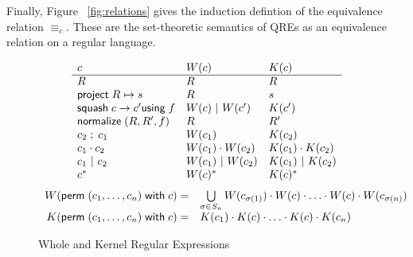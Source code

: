 \documentclass[acmsmall,review,anonymous]{acmart}
\newcommand{\kw}[1]{\ensuremath{\mathsf{#1}}}
\newcommand{\project}[2]{\ensuremath{\kw{project} \; #1 \mapsto #2}}
\newcommand{\squash}[3]{\ensuremath{\kw{squash} \; #1 \rightarrow #2
\kw{using} \; #3}}
\newcommand{\perm}[2]{\ensuremath{\kw{perm}\; (#1)\; \kw{with}\; #2}}
\newcommand{\normalize}[3]{\ensuremath{\kw{normalize} \; (#1, #2, #3)}}
\newcommand{\sep}{\ensuremath{\ | \ }}
\newcommand{\eqrel}[1]{\ensuremath{\equiv_{#1}}}
\begin{document}
Finally, Figure ~\ref{fig:relations} gives the induction defintion of the
equivalence relation $\eqrel{c}$. These are the set-theoretic semantics of QREs
as an equivalence relation on a regular language.

\begin{figure}[t]
\centering
\[
\begin{array}{l@{\quad}l@{\quad}l}

c & W(c) & K(c) \\ \hline
R & R & R \\
\project{R}{s} & R & s \\
\squash{c}{c'}{f} & W(c) \sep W(c') & K(c') \\
\normalize{R}{R'}{f} & R & R' \\
c_2 \; ; \; c_1 & W(c_1) & K(c_2) \\
c_1 \cdot c_2 & W(c_1) \cdot W(c_2) & K(c_1) \cdot K(c_2) \\
c_1 \sep c_2 & W(c_1) \sep W(c_2) & K(c_1) \sep K(c_2) \\
c^* & W(c)^* & K(c)^* \\
\end{array}
\]
\[
\begin{array}{r@{\quad}l}
W( \perm{c_1, \ldots, c_n}{c} ) = &
\bigcup \limits_{\sigma \in S_n} W(c_{\sigma(1)}) \cdot W(c) \cdot \ldots \cdot
W(c) \cdot W(c_{\sigma(n)})\\
K( \perm{c_1, \ldots, c_n}{c} ) = & K(c_1) \cdot K(c) \cdot \ldots \cdot K(c)
\cdot K(c_n)
\end{array}
\]
\caption{Whole and Kernel Regular Expressions}
\label{fig:wk}
\end{figure}
\end{document}
